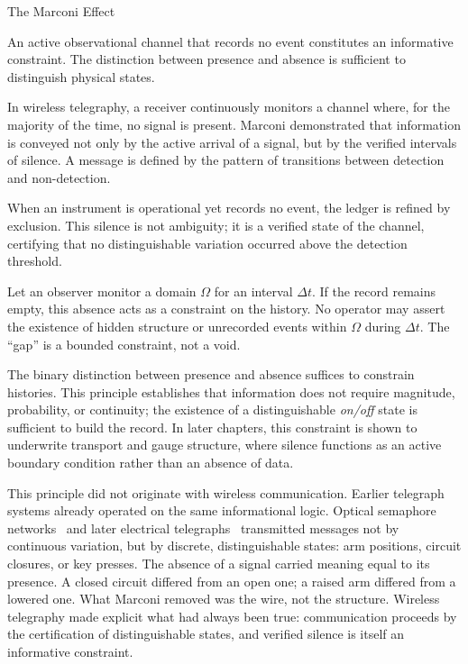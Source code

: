 \begin{phenom}{The Marconi Effect~\cite{marconi1901}}
\label{ph:marconi}

\PhStatement
An active observational channel that records no event constitutes an
informative constraint. The distinction between presence and absence is
sufficient to distinguish physical states.

\PhOrigin
In wireless telegraphy, a receiver continuously monitors a channel where, for
the majority of the time, no signal is present. Marconi demonstrated that
information is conveyed not only by the active arrival of a signal, but by the
verified intervals of silence. A message is defined by the pattern of
transitions between detection and non-detection.

\PhObservation
When an instrument is operational yet records no event, the ledger is refined
by exclusion. This silence is not ambiguity; it is a verified state of the
channel, certifying that no distinguishable variation occurred above the
detection threshold.

\PhConstraint
Let an observer monitor a domain $\Omega$ for an interval $\Delta t$. If the
record remains empty, this absence acts as a constraint on the 
history. No operator may assert the existence of hidden structure or
unrecorded events within $\Omega$ during $\Delta t$. The ``gap'' is a bounded
constraint, not a void.

\PhConsequence
The binary distinction between presence and absence suffices to constrain
histories. This principle establishes that information does not
require magnitude, probability, or continuity; the existence of a
distinguishable \emph{on/off} state is sufficient to build the record. In later
chapters, this constraint is shown to underwrite transport and gauge
structure, where silence functions as an active boundary condition rather
than an absence of data.

\end{phenom}

This principle did not originate with wireless communication. Earlier telegraph
systems already operated on the same informational logic. Optical semaphore
networks~\cite{chappe1801} and later electrical telegraphs~\cite{morse1844} transmitted 
messages not by continuous
variation, but by discrete, distinguishable states: arm positions, circuit
closures, or key presses. The absence of a signal carried meaning equal to its
presence. A closed circuit differed from an open one; a raised arm differed from
a lowered one. What Marconi removed was the wire, not the structure. Wireless
telegraphy made explicit what had always been true: communication proceeds by
the certification of distinguishable states, and verified silence is itself an
informative constraint.

